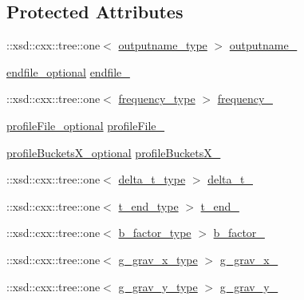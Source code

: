 \subsection*{Protected Attributes}
\begin{DoxyCompactItemize}
\item 
\+::xsd\+::cxx\+::tree\+::one$<$ \hyperlink{classsetting__t_a176d76dc9ab1b149c679035ce0aa5448}{outputname\+\_\+type} $>$ \hyperlink{classsetting__t_a8bec919fe4bf9b94ecc2dcbf1f66b9ea}{outputname\+\_\+}
\item 
\hyperlink{classsetting__t_a38dbb691ee80d982dc24fd1b3e514f1e}{endfile\+\_\+optional} \hyperlink{classsetting__t_a342b748a69b54f564e796b742eefc51c}{endfile\+\_\+}
\item 
\+::xsd\+::cxx\+::tree\+::one$<$ \hyperlink{classsetting__t_af0353930c8d9e0e19ee57943f2d130ee}{frequency\+\_\+type} $>$ \hyperlink{classsetting__t_acc63e2284b740c746bdf1dab028b858a}{frequency\+\_\+}
\item 
\hyperlink{classsetting__t_a9fc7a23427369cf0af6e4521b9e88d64}{profile\+File\+\_\+optional} \hyperlink{classsetting__t_a14250ed60f031fe4744b4ecc4df8f1f6}{profile\+File\+\_\+}
\item 
\hyperlink{classsetting__t_abe44e9ac5bfb035f396dc36d8a9831d6}{profile\+Buckets\+X\+\_\+optional} \hyperlink{classsetting__t_a84d15e778fb4f74bb05093cc95bcb21a}{profile\+Buckets\+X\+\_\+}
\item 
\+::xsd\+::cxx\+::tree\+::one$<$ \hyperlink{classsetting__t_ad2336c5ecdc0977272ba8126243d7977}{delta\+\_\+t\+\_\+type} $>$ \hyperlink{classsetting__t_aa3a9ca5e9fac7f5071d10188a07fc82d}{delta\+\_\+t\+\_\+}
\item 
\+::xsd\+::cxx\+::tree\+::one$<$ \hyperlink{classsetting__t_ab27962fdbca01941c3b6c632bc7ac360}{t\+\_\+end\+\_\+type} $>$ \hyperlink{classsetting__t_ac8bc0677b3f39c6549ab0d632acbad70}{t\+\_\+end\+\_\+}
\item 
\+::xsd\+::cxx\+::tree\+::one$<$ \hyperlink{classsetting__t_afd5541e25ce3565005acb9c70bddda2d}{b\+\_\+factor\+\_\+type} $>$ \hyperlink{classsetting__t_a80abcacaecfeb5b1db1f4dad2588c5f1}{b\+\_\+factor\+\_\+}
\item 
\+::xsd\+::cxx\+::tree\+::one$<$ \hyperlink{classsetting__t_af2a0b22be63f361de8ba6df7313b1a68}{g\+\_\+grav\+\_\+x\+\_\+type} $>$ \hyperlink{classsetting__t_a2cdb29eafe8ba71597e86ef6383cc668}{g\+\_\+grav\+\_\+x\+\_\+}
\item 
\+::xsd\+::cxx\+::tree\+::one$<$ \hyperlink{classsetting__t_a89b3c653de2dc5afa902042e34939589}{g\+\_\+grav\+\_\+y\+\_\+type} $>$ \hyperlink{classsetting__t_a461b25a23d03b78499a0eb68ba22ebd4}{g\+\_\+grav\+\_\+y\+\_\+}

\end{DoxyCompactItemize}
